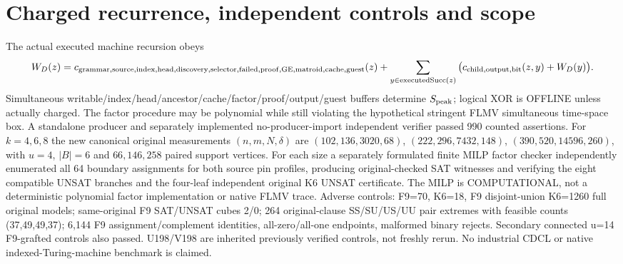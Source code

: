 \documentclass[11pt]{article}
\begin{document}
\section{Charged recurrence, independent controls and scope}
The actual executed machine recursion obeys
\[
W_D(z)=c_{\rm grammar,source,index,head,discovery,selector,failed,proof,GE,matroid,cache,guest}(z)
+\sum_{y\in\mathrm{executedSucc}(z)}\big(c_{\rm child,output,bit}(z,y)+W_D(y)\big).
\]
Simultaneous writable/index/head/ancestor/cache/factor/proof/output/guest buffers determine $S_{\rm peak}$; logical XOR is OFFLINE unless actually charged. The factor procedure may be polynomial while still violating the hypothetical stringent FLMV simultaneous time-space box.
A standalone producer and separately implemented no-producer-import independent verifier passed 990 counted assertions. For $k=4,6,8$ the new canonical original measurements $(n,m,N,\delta)$ are $(102,136,3020,68)$, $(222,296,7432,148)$, $(390,520,14596,260)$, with $u=4$, $|B|=6$ and $66,146,258$ paired support vertices. For each size a separately formulated finite MILP factor checker independently enumerated all 64 boundary assignments for both source pin profiles, producing original-checked SAT witnesses and verifying the eight compatible UNSAT branches and the four-leaf independent original K6 UNSAT certificate. The MILP is COMPUTATIONAL, not a deterministic polynomial factor implementation or native FLMV trace.
Adverse controls: F9=70, K6=18, F9 disjoint-union K6=1260 full original models; same-original F9 SAT/UNSAT cubes 2/0; 264 original-clause SS/SU/US/UU pair extremes with feasible counts (37,49,49,37); 6,144 F9 assignment/complement identities, all-zero/all-one endpoints, malformed binary rejects. Secondary connected u=14 F9-grafted controls also passed. U198/V198 are inherited previously verified controls, not freshly rerun. No industrial CDCL or native indexed-Turing-machine benchmark is claimed.
\end{document}
